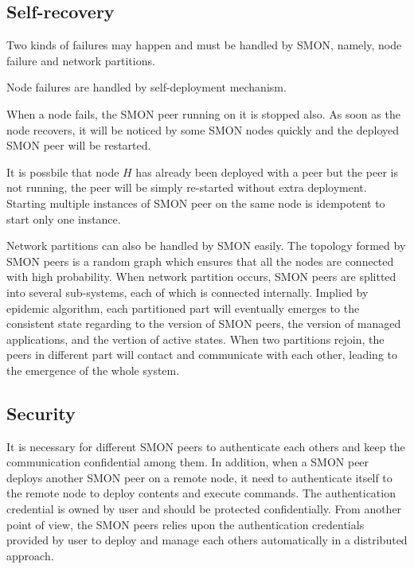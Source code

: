 
\subsection{Self-recovery}

Two kinds of failures may happen and must be handled by SMON,
namely, node failure and network partitions.

Node failures are handled by self-deployment mechanism.

When a node fails, the SMON peer running on it is stopped also.
As soon as the node recovers, it will be noticed by some SMON
nodes quickly and the deployed SMON peer will be restarted.

It is possbile that 
node $H$ has already been deployed with a peer but the peer
is not running, the peer will be simply re-started without extra
deployment. Starting multiple instances of SMON peer on the same
node is idempotent to start only one instance. 


Network partitions can also be handled by SMON easily. The
topology formed by SMON peers is a random graph which ensures
that all the nodes are connected with high probability. When
network partition occurs, SMON peers are splitted into several
sub-systems, each of which is connected internally. Implied by
epidemic algorithm, each partitioned part will eventually
emerges to the consistent state regarding to the version of SMON
peers, the version of managed applications, and the vertion of
active states. When two partitions rejoin, the peers in
different part will contact and communicate with each other,
leading to the emergence of the whole system.

\subsection{Security}
\label{subsec:security}

It is necessary for different SMON peers to authenticate each
others and keep the communication confidential among them. In
addition, when a SMON peer deploys another SMON peer on a remote
node, it need to authenticate
itself to the remote node to deploy contents and execute
commands. The authentication credential is owned by user and
should be protected confidentially. From another point of view,
the SMON peers relies upon the authentication credentials
provided by user to deploy and manage each others automatically
in a distributed approach. 

